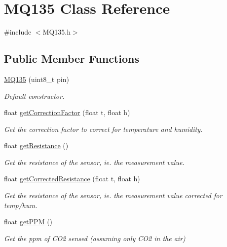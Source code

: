 \hypertarget{class_m_q135}{}\section{M\+Q135 Class Reference}
\label{class_m_q135}


{\ttfamily \#include $<$M\+Q135.\+h$>$}

\subsection*{Public Member Functions}
\begin{DoxyCompactItemize}
\item 
\hyperlink{class_m_q135_a0c2f7edac1cfd8eeba31ac921eb16007}{M\+Q135} (uint8\+\_\+t pin)
\begin{DoxyCompactList}\small\item\em Default constructor. \end{DoxyCompactList}\item 
float \hyperlink{class_m_q135_a83aeaf6f5d96201420b2e8309101799c}{get\+Correction\+Factor} (float t, float h)
\begin{DoxyCompactList}\small\item\em Get the correction factor to correct for temperature and humidity. \end{DoxyCompactList}\item 
float \hyperlink{class_m_q135_a5517b514c0a0459632d6c431bc884c92}{get\+Resistance} ()
\begin{DoxyCompactList}\small\item\em Get the resistance of the sensor, ie. the measurement value. \end{DoxyCompactList}\item 
float \hyperlink{class_m_q135_ae2831a68678ed327a646b8a112cd2932}{get\+Corrected\+Resistance} (float t, float h)
\begin{DoxyCompactList}\small\item\em Get the resistance of the sensor, ie. the measurement value corrected for temp/hum. \end{DoxyCompactList}\item 
float \hyperlink{class_m_q135_a93a37053cc2fcc536817ec647af1c41c}{get\+P\+PM} ()
\begin{DoxyCompactList}\small\item\em Get the ppm of C\+O2 sensed (assuming only C\+O2 in the air) \end{DoxyCompactList}\item 

\end{DoxyCompactItemize}
